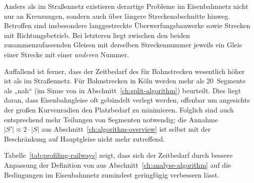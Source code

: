 \documentclass[../main/thesis.tex]{subfiles}
\begin{document}

Anders als im Straßennetz existieren derartige Probleme im Eisenbahnnetz nicht nur an Kreuzungen, sondern auch über längere Streckenabschnitte hinweg.
Betroffen sind insbesondere langgestreckte Überwerfungsbauwerke sowie Strecken mit Richtungsbetrieb.
Bei letzteren liegt zwischen den beiden zusammenzufassenden Gleisen mit derselben Streckennummer jeweils ein Gleis einer Strecke mit einer \emph{anderen} Nummer. 

Auffallend ist ferner, dass der Zeitbedarf des  für Bahnstrecken wesentlich höher ist als im Straßennetz.
Für Bahnstrecken in Köln werden mehr als 20~Segmente als „nah“ (im Sinne von  in Abschnitt~\ref{ch:split-algorithm}) beurteilt.
Dies liegt daran, dass Eisenbahngleise oft gebündelt verlegt werden, offenbar um angesichts der großen Kurvenradien den Platzbedarf zu minimieren.
Folglich sind auch entsprechend mehr Teilungen von Segmenten notwendig;
die Annahme $|S'| \approx 2 \cdot |S|$ aus Abschnitt~\ref{ch:algorithm-overview} ist selbst mit der Beschränkung auf Hauptgleise nicht mehr zutreffend.

Tabelle~\ref{tab:profiling-railways} zeigt, dass sich der Zeitbedarf durch bessere Anpassung der Definition von  aus Abschnitt~\ref{ch:analyse-algorithm} auf die Bedingungen im Eisenbahnnetz zumindest geringfügig verbessern lässt.
\end{document}
